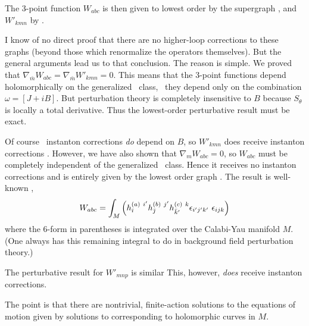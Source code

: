 The 3-point function $W_{abc}$ is then given to lowest order by the supergraph
\tfig\grapha, and $W'_{kmn}$ by \tfig\graphb.


I know of no direct proof that there are no higher-loop corrections to these
graphs (beyond those which renormalize the operators themselves). But the
general arguments lead us to that conclusion. The reason is simple. We
proved that $\nabla_{\bar m}W_{abc}=\nabla_{\bar m}W'_{kmn}=0$. This means
that the 3-point functions depend holomorphically on the generalized \Ka\
class, \ie\ they depend only on the combination $\omega=[J+iB]$. But
perturbation theory is completely insensitive to $B$ because $S_\theta$ is
locally a total derivative. Thus the lowest-order perturbative result must be
exact.

Of course \sm\ instanton corrections {\it do} depend on $B$, so $W'_{kmn}$
does receive instanton corrections \DSWW. However, we have also shown that
$\nabla_mW_{abc}=0$, so $W_{abc}$ must be completely independent of the
generalized \Ka\ class. Hence it receives no instanton corrections and is
entirely given by the lowest order graph \grapha. The result is well-known
\GSW,
$$W_{abc}=\int_M \left(h_{\ib}^{(a)\ i'}h_{\jb}^{(b)\ j'}h_{\bar k'}^{(c)\
k}\epsilon_{i'j'k'}\ \epsilon_{ijk}\right)$$
where the 6-form in parentheses is integrated over the Calabi-Yau manifold
$M$. (One always has this remaining integral to do in background field
perturbation theory.)

The perturbative result for $W'_{mnp}$ is similar
\eqn{}
This, however, {\it does} receive instanton corrections.

The point is that there are nontrivial, finite-action solutions to the
equations
of motion given by solutions to
\eqn{}
corresponding to holomorphic curves in $M$.

